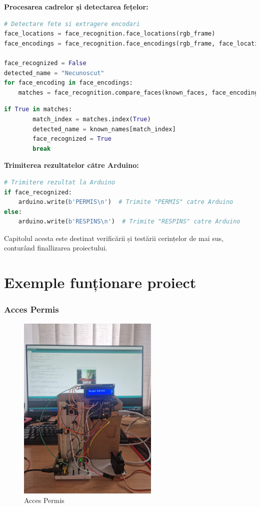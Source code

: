 \documentclass{report}
\begin{document}
\textbf{Procesarea cadrelor și detectarea fețelor:}
\begin{lstlisting}[language=Python]
# Detectare fete si extragere encodari
face_locations = face_recognition.face_locations(rgb_frame)
face_encodings = face_recognition.face_encodings(rgb_frame, face_locations)

face_recognized = False
detected_name = "Necunoscut"
for face_encoding in face_encodings:
    matches = face_recognition.compare_faces(known_faces, face_encoding, tolerance=0.6)
    \end{lstlisting}
    \newpage
    \vspace*{1cm}
    \begin{lstlisting}[language=Python]
    if True in matches:
        match_index = matches.index(True)
        detected_name = known_names[match_index]
        face_recognized = True
        break
\end{lstlisting}

\textbf{Trimiterea rezultatelor către Arduino:}
\begin{lstlisting}[language=Python]
# Trimitere rezultat la Arduino
if face_recognized:
    arduino.write(b'PERMIS\n')  # Trimite "PERMIS" catre Arduino
else:
    arduino.write(b'RESPINS\n')  # Trimite "RESPINS" catre Arduino
\end{lstlisting}

Capitolul acesta este destinat verificării și testării cerințelor de mai sus, conturând finallizarea proiectului.

\chapter{Exemple funționare proiect}
\subsection{Acces Permis}
\begin{figure}[H]
    \centering
    \includegraphics[width=0.6\textwidth]{acces_permis.jpg}
    \caption{Acces Permis}
    \label{acces_permis}
\end{figure} 
\newpage
\vspace*{1cm}
\end{document}
